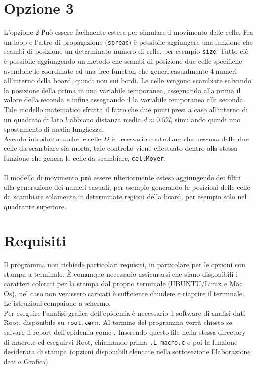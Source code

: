 \documentclass[a4paper]{article}
\begin{document}
\section{Opzione 3}
L'opzione 2 Può essere facilmente estesa per simulare il movimento delle celle. Fra un loop e l'altro di propagazione (\texttt{spread}) è possibile aggiungere una funzione che scambi di posizione un determinato numero di celle, per esempio \texttt{size}. Tutto ciò è possibile aggiungendo un metodo che scambi di posizione due celle specifiche avendone le coordinate ed una free function che generi casualmente 4 numeri all'interno della board, quindi non sui bordi. Le celle vengono scambiate salvando la posizione della prima in una variabile temporanea, assegnando alla prima il valore della seconda e infine assegnando il la variabile temporanea alla seconda. Tale modello matematico sfrutta il fatto che due punti presi a caso all'interno di un quadrato di lato $l$ abbiano distanza media $d \approx 0.52l$, simulando quindi uno spostamento di media lunghezza.\\
Avendo introdotto anche le celle $D$ è necessario controllare che nessuna delle due celle da scambiare sia morta, tale controllo viene effettuato dentro alla stessa funzione che genera le celle da scambiare, \texttt{cellMover}.\\ \\
Il modello di movimento può essere ulteriormente esteso aggiungendo dei filtri alla generazione dei numeri casuali, per esempio generando le posizioni delle celle da scambiare solamente in determinate regioni della board, per esempio solo nel quadrante superiore.\\

\section{Requisiti}
Il programma non richiede particolari requisiti, in particolare per le opzioni con stampa a terminale. \`E comunque necessario assicurarsi che siano disponibili i caratteri colorati per la stampa dal proprio terminale (UBUNTU/Linux e Mac Os), nel caso non venissero caricati è sufficiente chiudere e riaprire il terminale.\\
Le istruzioni compaiono a schermo.\\
Per eseguire l'analisi grafica dell'epidemia è necessario il software di analisi dati Root, disponibile su \texttt{root.cern}.
Al termine del programma verrà chiesto se salvare il report dell'epidemia come . Inserendo questo file nella stessa directory di macro.c ed eseguirvi Root, chiamando prima \texttt{.L macro.c} e poi la funzione desiderata di stampa (opzioni disponibili elencate nella sottosezione Elaborazione dati e Grafica).
\end{document}
